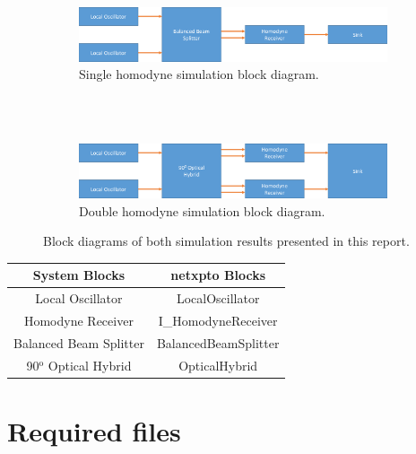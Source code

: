 \documentclass[a4paper]{article}
\begin{document}
\begin{figure}[h]
\centering
\begin{subfigure}{\linewidth}
\includegraphics[width=\linewidth]{singlehomodyneSimuBlock.png}
\caption{Single homodyne simulation block diagram.}
\label{fig:singleH}
\end{subfigure}
\\
~
\\
\begin{subfigure}{\linewidth}
\includegraphics[width=\linewidth]{doublehomodyneSimuBlock.png}
\caption{Double homodyne simulation block diagram.}
\label{fig:doubleH}
\end{subfigure}
\caption{Block diagrams of both simulation results presented in this report.}
\end{figure}

\begin{table}[H]
\centering
\begin{tabular}{c|c}
System Blocks          & netxpto Blocks       \\ \hline
Local Oscillator       & LocalOscillator      \\
Homodyne Receiver      & I\_HomodyneReceiver   \\
Balanced Beam Splitter & BalancedBeamSplitter \\
90$^\text{o}$ Optical Hybrid     & OpticalHybrid
\end{tabular}
\end{table}

\pagebreak
\section{Required files}\label{Required files}
\end{document}

